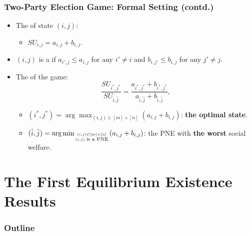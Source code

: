 \documentclass[xcolor=dvipsnames,envcountsect]{beamer}
\begin{document}
\begin{frame}
	\frametitle{Two-Party Election Game: Formal Setting (contd.)}
	\begin{itemize}
		\item The  of state $(i,j)$: 
		\begin{itemize}
			\item [] $SU_{i,j} = a_{i,j} + b_{i,j}$.
		\end{itemize}
		\vspace{6pt}
		\item $(i,j)$ is a  if $a_{i',j}\leq a_{i,j}$ for any $i'\neq i$ 
		and $b_{i,j'} \leq b_{i,j}$ for any $j'\neq j$.
		\pause
		\vspace{6pt}
		\item The  of the game: 
			\[
			\frac{SU_{i^*,j^*}}{SU_{\hat{i},\hat{j}}} = 
			\frac{a_{i^*,j^*} + b_{i^*,j^*}}{a_{\hat{i},\hat{j}}+b_{\hat{i},\hat{j}}},
			\]
		\begin{itemize}
			\item $(i^*,j^*) = \arg\max_{(i,j)\in [m]\times [n]}(a_{i,j}+b_{i,j})$: {\bf the optimal state}.
			\item $(\hat{i},\hat{j}) = \arg\min_{(i,j)\in [m]\times [n]\atop (i,j)\mbox{\scriptsize \;is a PNE}}(a_{i,j}+b_{i,j})$: the PNE with {\bf the worst} social welfare.
		\end{itemize}
	\end{itemize}
\end{frame}


\section{The First Equilibrium Existence Results}


\begin{frame}
	\frametitle{Outline}
\end{frame}
\end{document}
